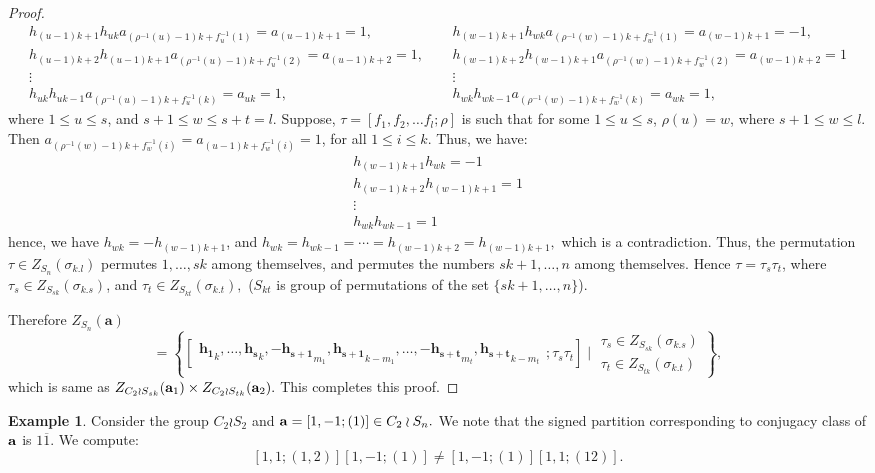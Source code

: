 \documentclass[12pt,twoside,reqno]{amsart}
\theoremstyle{definition}
\newtheorem{example}[theorem]{Example}
\numberwithin{equation}{section}
\newcommand{\bmf}[1]{\mathbf{#1}}
\begin{document}
\begin{proof}
$$\begin{smallmatrix}
h_{(u-1)k+1}h_{uk}a_{(\rho^{-1}(u)-1)k+f^{-1}_u(1)} = a_{(u-1)k+1} = 1, &~~& h_{(w-1)k+1}h_{wk}a_{(\rho^{-1}(w)-1)k+f^{-1}_w(1)}= a_{(w-1)k+1} = -1,\\
h_{(u-1)k+2}h_{(u-1)k+1}a_{(\rho^{-1}(u)-1)k+f^{-1}_u(2)} = a_{(u-1)k+2} = 1, &~~&h_{(w-1)k+2}h_{(w-1)k+1}a_{(\rho^{-1}(w)-1)k+f^{-1}_w(2)}= a_{(w-1)k+2} = 1\\
\vdots & ~~ & \vdots\\
h_{uk}h_{uk-1}a_{(\rho^{-1}(u)-1)k+f^{-1}_u(k)} = a_{uk} =1,&~~& h_{wk}h_{wk-1}a_{(\rho^{-1}(w)-1)k+f^{-1}_w(k)}= a_{wk} = 1,
\end{smallmatrix} $$
where $1\leq u \leq s$, and $s+1\leq w\leq s+t=l.$
Suppose, $\tau=[f_1, f_2, \dots f_l; \rho]$ is such that for some $1 \leq u \leq s$, $\rho(u) = w$, where $s+1 \leq w\leq l$. Then $a_{(\rho^{-1}(w)-1)k + f_w^{-1}(i)} = a_{(u-1)k+f_w^{-1}(i)} = 1$, for all $1\leq i \leq k$. Thus, we have:
$$\begin{smallmatrix}
h_{(w-1)k+1}h_{wk} = -1\\
h_{(w-1)k+2}h_{(w-1)k+1} = 1\\
\vdots\\
h_{wk}h_{wk-1} = 1
\end{smallmatrix}
$$
hence, we have $h_{wk} = -h_{(w-1)k+1}$, and $h_{wk} = h_{wk-1}= \cdots = h_{(w-1)k+2} = h_{(w-1)k+1},$ which is a contradiction. Thus, the permutation $\tau \in Z_{S_n}(\sigma_{k.l})$ permutes $1,\ldots, sk$ among themselves, and permutes the numbers $sk+1,\ldots,n$ among themselves. Hence $\tau = \tau_s\tau_t$, where $\tau_s \in Z_{S_{sk}}(\sigma_{k.s})$, and $\tau_t \in Z_{S_{kt}}(\sigma_{k.t}),$ ($S_{kt}$ is group of permutations of the set $\{sk+1, \ldots, n\}$).

Therefore $Z_{{S_n}}(\bmf{a})$  $$= \left\{\left[\begin{matrix}\bmf{h_1}_k,\ldots,\bmf{h_s}_k, -\bmf{h_{s+1}}_{m_1} ,\bmf{h_{s+1}}_{k-m_1} ,\ldots,-\bmf{h_{s+t}}_{m_t} ,\bmf{h_{s+t}}_{k-m_t}
\end{matrix}; \tau_s\tau_t\right] \mid \begin{matrix}\tau_s \in Z_{S_{sk}}(\sigma_{k.s})\\ \tau_t \in Z_{S_{tk}}(\sigma_{k.t})\end{matrix}\right\},$$
which is same as  $Z_{C_2 \wr {S_{sk}}}({\bf a}_1)\times Z_{C_2 \wr {S_{tk}}}({\bf a}_2).$ This completes this proof.
\end{proof}
\begin{example}
Consider the group $C_2\wr S_2$ and ${\bf a}= [1,-1 ; (1)] \in C_2 \wr S_n.$ We note that the signed partition corresponding to conjugacy class of ${\bf a}$ is $1\overline{1}.$ We compute:
$$[1,1; (1,2)] [1,-1; (1)] \neq [1,-1 ; (1)][1,1 ; (12)].$$
\end{example}
\end{document}
